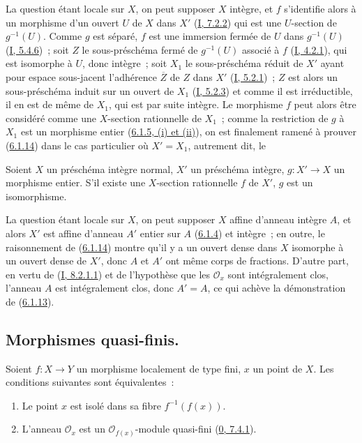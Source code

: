 La question étant locale sur $X$, on peut supposer $X$ intègre, et $f$
s'identifie alors à un morphisme d'un ouvert $U$ de $X$ dans $X'$
(\hyperref[I.7.2.2-fr]{I, 7.2.2}) qui est une $U$-section de $g^{-1}(U)$.
Comme $g$ est séparé, $f$ est une immersion fermée de $U$ dans $g^{-1}(U)$
(\hyperref[I.5.4.6-fr]{I, 5.4.6})~; soit $Z$ le sous-préschéma fermé de
$g^{-1}(U)$ associé à $f$ (\hyperref[I.4.2.1-fr]{I, 4.2.1}), qui est
isomorphe à $U$, donc intègre~; soit $X_1$ le sous-préschéma réduit de $X'$
ayant pour espace sous-jacent l'adhérence $\overline{Z}$ de $Z$ dans $X'$
(\hyperref[I.5.2.1-fr]{I, 5.2.1})~; $Z$ est alors un sous-préschéma induit
sur un ouvert de $X_1$ (\hyperref[I.5.2.3-fr]{I, 5.2.3}) et comme il est
irréductible, il en est de même de $X_1$, qui est par suite intègre. Le
morphisme $f$ peut alors être considéré comme une $X$-section rationnelle de
$X_1$~; comme la restriction de $g$ à $X_1$ est un morphisme entier
(\hyperref[II.6.1.5-fr]{6.1.5, (i) et (ii)}), on est finalement ramené à
prouver (\hyperref[II.6.1.14-fr]{6.1.14}) dans le cas particulier où
$X'=X_1$, autrement dit, le

\begin{corollary}[6.1.15]
\label{II.6.1.15-fr}
Soient $X$ un préschéma intègre normal, $X'$ un préschéma intègre,
$g:X'\to X$ un morphisme entier. S'il existe une $X$-section rationnelle $f$
de $X'$, $g$ est un isomorphisme.
\end{corollary}

La question étant locale sur $X$, on peut supposer $X$ affine d'anneau
intègre $A$, et alors $X'$ est affine d'anneau $A'$ entier sur $A$
(\hyperref[II.6.1.4-fr]{6.1.4}) et intègre~; en outre, le raisonnement de
(\hyperref[II.6.1.14-fr]{6.1.14}) montre qu'il y a un ouvert dense dans $X$
isomorphe à un ouvert dense de $X'$, donc $A$ et $A'$ ont même corps de
fractions. D'autre part, en vertu de
(\hyperref[I.8.2.1.1-fr]{I, 8.2.1.1}) et de l'hypothèse que les
$\mathcal{O}_x$ sont intégralement clos, l'anneau $A$ est intégralement clos,
donc $A'=A$, ce qui achève la démonstration de
(\hyperref[II.6.1.13-fr]{6.1.13}).

\subsection{Morphismes quasi-finis.}
\label{subsection:II.6.2-fr}

\begin{proposition}[6.2.1]
\label{II.6.2.1-fr}
Soient $f:X\to Y$ un morphisme localement de type fini, $x$ un point de $X$.
Les conditions suivantes sont équivalentes~:


\begin{enumerate}
\item[a)] Le point $x$ est isolé dans sa fibre $f^{-1}(f(x))$.
\item[b)] L'anneau $\mathcal{O}_x$ est un $\mathcal{O}_{f(x)}$-module
quasi-fini (\hyperref[0.7.4.1-fr]{0, 7.4.1}).
\end{enumerate}
\end{proposition}


